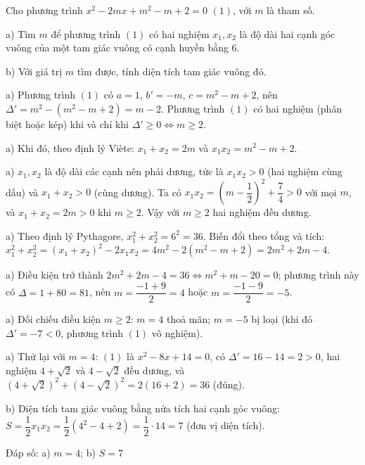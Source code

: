 \begin{problem}[9DS-PT2-020]
Cho phương trình $x^2 - 2mx + m^2 - m + 2 = 0$ $(1)$, với $m$ là tham số.

a) Tìm $m$ để phương trình $(1)$ có hai nghiệm $x_1, x_2$ là độ dài hai cạnh góc vuông của một tam giác vuông có cạnh huyền bằng $6$.

b) Với giá trị $m$ tìm được, tính diện tích tam giác vuông đó.

\begin{solution}
a) Phương trình $(1)$ có $a = 1$, $b' = -m$, $c = m^2 - m + 2$, nên $\Delta' = m^2 - (m^2 - m + 2) = m - 2$. Phương trình $(1)$ có hai nghiệm (phân biệt hoặc kép) khi và chỉ khi $\Delta' \geq 0 \Leftrightarrow m \geq 2$.

a) Khi đó, theo định lý Viète: $x_1 + x_2 = 2m$ và $x_1 x_2 = m^2 - m + 2$.

a) $x_1, x_2$ là độ dài các cạnh nên phải dương, tức là $x_1 x_2 > 0$ (hai nghiệm cùng dấu) và $x_1 + x_2 > 0$ (cùng dương). Ta có $x_1 x_2 = \left(m - \dfrac{1}{2}\right)^2 + \dfrac{7}{4} > 0$ với mọi $m$, và $x_1 + x_2 = 2m > 0$ khi $m \geq 2$. Vậy với $m \geq 2$ hai nghiệm đều dương.

a) Theo định lý Pythagore, $x_1^2 + x_2^2 = 6^2 = 36$. Biến đổi theo tổng và tích: $x_1^2 + x_2^2 = (x_1 + x_2)^2 - 2x_1x_2 = 4m^2 - 2(m^2 - m + 2) = 2m^2 + 2m - 4$.

a) Điều kiện trở thành $2m^2 + 2m - 4 = 36 \Leftrightarrow m^2 + m - 20 = 0$; phương trình này có $\Delta = 1 + 80 = 81$, nên $m = \dfrac{-1 + 9}{2} = 4$ hoặc $m = \dfrac{-1 - 9}{2} = -5$.

a) Đối chiếu điều kiện $m \geq 2$: $m = 4$ thoả mãn; $m = -5$ bị loại (khi đó $\Delta' = -7 < 0$, phương trình $(1)$ vô nghiệm).

a) Thử lại với $m = 4$: $(1)$ là $x^2 - 8x + 14 = 0$, có $\Delta' = 16 - 14 = 2 > 0$, hai nghiệm $4 + \sqrt{2}$ và $4 - \sqrt{2}$ đều dương, và $(4 + \sqrt{2})^2 + (4 - \sqrt{2})^2 = 2(16 + 2) = 36$ (đúng).

b) Diện tích tam giác vuông bằng nửa tích hai cạnh góc vuông: $S = \dfrac{1}{2}x_1x_2 = \dfrac{1}{2}(4^2 - 4 + 2) = \dfrac{1}{2} \cdot 14 = 7$ (đơn vị diện tích).

Đáp số: a) $\boxed{m = 4}$; b) $\boxed{S = 7}$
\end{solution}
\end{problem}

